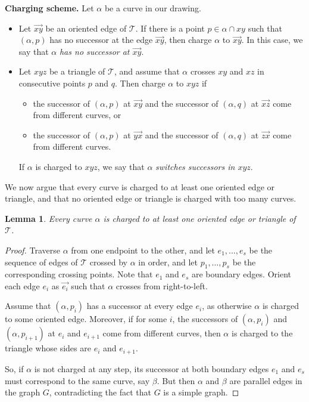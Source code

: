 \documentclass[11pt]{amsart}
\newtheorem{lemma}[theorem]{Lemma}
\theoremstyle{definition}
\newcommand{\cT}{\mathcal{T}}
\begin{document}
\bigskip

\noindent
\textbf{Charging scheme.} Let $\alpha$ be a curve in our drawing. 
\begin{itemize}
    \item Let $\vec{xy}$ be an oriented edge of $\cT$. If there is a point $p\in \alpha\cap xy$ such that $(\alpha,p)$ has no successor at the edge $\vec{xy}$, then charge $\alpha$ to $\vec{xy}$. In this case, we say that $\alpha$ \emph{has no successor at $\vec{xy}$}.
    \item Let $xyz$ be a triangle of $\cT$, and assume that $\alpha$ crosses $xy$ and $xz$ in consecutive points $p$ and $q$. Then charge $\alpha$ to $xyz$ if
    \begin{itemize}
        \item  the successor of $(\alpha,p)$ at $\vec{xy}$ and the successor of $(\alpha,q)$ at $\vec{xz}$ come from different curves, or
        \item  the successor of $(\alpha,p)$ at $\vec{yx}$ and the successor of $(\alpha,q)$ at $\vec{zx}$ come from different curves.
    \end{itemize}
    If $\alpha$ is charged to $xyz$, we say that $\alpha$ \emph{switches successors in $xyz$}.
\end{itemize}

\medskip

We now argue that every curve is charged to at least one oriented edge or triangle, and that no oriented edge or triangle is charged with too many curves.

\begin{lemma}\label{lemma:charging_curves}
Every curve $\alpha$ is charged to at least one oriented edge or triangle of $\cT$. 
\end{lemma}
\begin{proof}
Traverse $\alpha$ from one endpoint to the other, and let $e_1, \dots, e_s$ be the sequence of edges of $\cT$ crossed by $\alpha$ in order, and let $p_1, \dots, p_s$ be the corresponding crossing points. Note that $e_1$ and $e_s$ are boundary edges. Orient each edge $e_i$ as $\vec{e_i}$ such that $\alpha$ crosses from right-to-left.

Assume that $(\alpha,p_i)$ has a successor at every edge $e_i$, as otherwise $\alpha$ is charged to some oriented edge. Moreover, if for some $i$, the successors of $(\alpha, p_i)$ and $(\alpha,p_{i+1})$ at $e_i$ and $e_{i+1}$ come from different curves, then $\alpha$ is charged to the triangle whose sides are $e_i$ and $e_{i+1}$. 

So, if $\alpha$ is not charged at any step, its successor at both boundary edges $e_1$ and $e_s$ must correspond to the same curve, say $\beta$. But then $\alpha$ and $\beta$ are parallel edges in the graph $G$, contradicting the fact that $G$ is a simple graph.
\end{proof}
\end{document}
